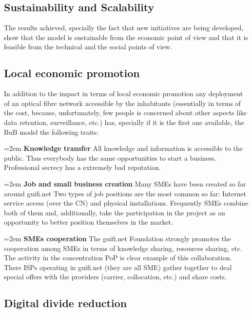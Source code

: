 \FloatBarrier
\subsection{Sustainability and Scalability}
\label{res_sustain}

The results achieved, specially the fact that new initiatives are being developed, show that the model is sustainable from the economic point of view and that it is feasible from the technical and the social points of view.


\FloatBarrier
\subsection{Local economic promotion}
\label{res_local_econ}

In addition to the impact in terms of local economic promotion any deployment of an optical fibre network accessible by the inhabitants (essentially in terms of the cost, because, unfortunately, few people is concerned about other aspects like data retention, surveillance, etc.) has, specially if it is the first one available, the BuB model the following traits:

\hangindent=2em
\textbf{Knowledge transfer}
All knowledge and information is accessible to the public. Thus everybody has the same opportunities to start a business. Professional secrecy has a extremely bad reputation.

\hangindent=2em
\textbf{Job and small business creation}
Many SMEs have been created so far around guifi.net Two types of job positions are the most common so far: Internet service access (over the CN) and physical installations. Frequently SMEs combine both of them and, additionally, take the participation in the project as an opportunity to better position themselves in the market.

\hangindent=2em
\textbf{SMEs cooperation}
The guifi.net Foundation strongly promotes the cooperation among SMEs in terms of knowledge sharing, resources sharing, etc. The activity in the concentration PoP is clear example of this collaboration. There ISPs operating in guifi.net (they are all SME) gather together to deal special offers with the providers (carrier, collocation, etc.) and share costs.


\FloatBarrier
\subsection{Digital divide reduction}
\label{res_digital_div}

